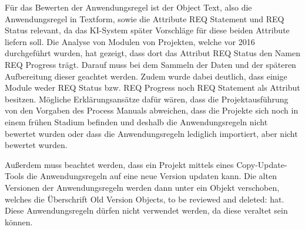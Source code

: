 Für das Bewerten der Anwendungsregel ist der Object Text, also die Anwendungsregel in Textform, sowie die Attribute REQ Statement und REQ Status relevant, da das KI-System später Vorschläge
für diese beiden Attribute liefern soll. Die Analyse von Modulen von Projekten, 
welche vor 2016 durchgeführt wurden, hat gezeigt, dass dort das Attribut REQ Status den Namen REQ Progress trägt. Darauf muss bei dem Sammeln der Daten und der späteren Aufbereitung dieser geachtet
werden. Zudem wurde dabei deutlich, dass einige Module weder REQ Status bzw. REQ Progress noch REQ Statement als Attribut besitzen. Mögliche Erklärungsansätze dafür wären, dass die Projektausführung
von den Vorgaben des Process Manuals abweichen, dass die Projekte sich noch in einem frühen Stadium befinden und deshalb die Anwendungsregeln nicht bewertet wurden oder dass die Anwendungsregeln lediglich
importiert, aber nicht bewertet wurden.

Außerdem muss beachtet werden, dass ein Projekt mittels eines Copy-Update-Tools die Anwendungsregeln auf eine neue Version updaten kann. Die alten Versionen der Anwendungsregeln werden dann unter ein Objekt
verschoben, welches die Überschrift \glqq Old Version Objects, to be reviewed and deleted: \grqq{} hat. Diese Anwendungsregeln dürfen nicht verwendet werden, da diese veraltet sein können. 
